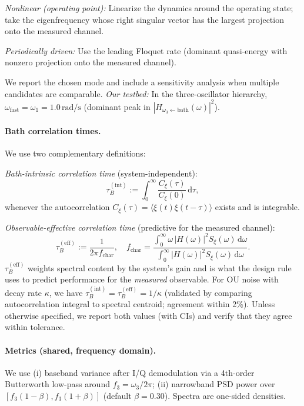 \documentclass[11pt,letterpaper]{article}
\begin{document}
\emph{Nonlinear (operating point):} Linearize the dynamics around the operating state; take the eigenfrequency whose right singular vector has the largest projection onto the measured channel.

\emph{Periodically driven:} Use the leading Floquet rate (dominant quasi-energy with nonzero projection onto the measured channel).

We report the chosen mode and include a sensitivity analysis when multiple candidates are comparable. \emph{Our testbed:} In the three-oscillator hierarchy, $\omega_{\mathrm{fast}}=\omega_1=1.0\,\mathrm{rad/s}$ (dominant peak in $|H_{\omega_3\leftarrow\mathrm{bath}}(\omega)|^2$).

\paragraph*{Bath correlation times.}
We use two complementary definitions:

\emph{Bath-intrinsic correlation time} (system-independent):
\[
\tau_B^{(\mathrm{int})} := \int_0^\infty \frac{C_\xi(\tau)}{C_\xi(0)}\,\mathrm{d}\tau,
\]
whenever the autocorrelation $C_\xi(\tau)=\langle\xi(t)\xi(t-\tau)\rangle$ exists and is integrable.

\emph{Observable-effective correlation time} (predictive for the measured channel):
\[
\tau_B^{(\mathrm{eff})} := \frac{1}{2\pi f_{\mathrm{char}}},\quad
f_{\mathrm{char}} = \frac{\int_0^\infty \omega\, |H(\omega)|^2 S_\xi(\omega)\,\mathrm{d}\omega}
{\int_0^\infty |H(\omega)|^2 S_\xi(\omega)\,\mathrm{d}\omega}.
\]
$\tau_B^{(\mathrm{eff})}$ weights spectral content by the system's gain and is what the design rule uses to predict performance for the \emph{measured} observable. For OU noise with decay rate $\kappa$, we have $\tau_B^{(\mathrm{int})}=\tau_B^{(\mathrm{eff})}=1/\kappa$ (validated by comparing autocorrelation integral to spectral centroid; agreement within 2\%). Unless otherwise specified, we report both values (with CIs) and verify that they agree within tolerance.

\paragraph*{Metrics (shared, frequency domain).}
We use (i) baseband variance after I/Q demodulation via a 4th-order Butterworth low-pass around $f_3=\omega_3/2\pi$; (ii) narrowband PSD power over $[f_3(1-\beta),f_3(1+\beta)]$ (default $\beta=0.30$). Spectra are one-sided densities.
\end{document}
